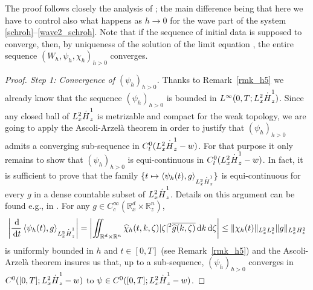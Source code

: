 \documentclass[11pt]{article}
\newcommand{\eg}{e.g.,\xspace}
\newcommand\mto{\mathchoice{\longmapsto}{\mapsto}{\mapsto}{\mapsto}}
\let\hat\oldhat
\DeclareRobustCommand{\accentset}[2]{\overset{#1}{#2}}
\theoremstyle{definition}
\newcommand*{\overbigdot}[1]{%
\accentset{\mbox{\large\bfseries .}}{#1}}
\let\hat\widehat
\newcommand{\R}{\mathbb{R}}
\newcommand{\ud}{\, {\mathrm{d}}}
\begin{document}
The proof follows closely the analysis of \cite{Lions_Paul_Wigner};
the main difference being that here we have to control also what happens as $h\to 0$ for the wave part of the system \eqref{schroh}--\eqref{wave2_schroh}.
Note that if the sequence of initial data is supposed to converge, then, by uniqueness of the solution of the limit equation \cite[Th.\,4]{dBGV}, the entire sequence
$(W_{h}, \psi_{h},\chi_{h})_{h>0}$ converges.

\begin{proof}[Proof. Step 1: Convergence of $(\psi_{h})_{h>0}$]
Thanks to Remark~\ref{rmk_h5} we already know that the sequence $(\psi_{h})_{h>0}$ is bounded in $L^{\infty}(0,T;L_{x}^{2}\overbigdot{H}_{z}^{1})$. Since any closed ball of $L_{x}^{2}\overbigdot{H}_{z}^{1}$ is metrizable and compact for the weak topology, we are going to apply the Ascoli-Arzelà theorem in order to justify that $(\psi_{h})_{h>0}$ admits a converging sub-sequence in $C_{t}^{0}(L_{x}^{2}\overbigdot{H}_{z}^{1}-w)$. For that purpose it only remains to show that $(\psi_{h})_{h>0}$ is equi-continuous in $C_{t}^{0}(L_{x}^{2}\overbigdot{H}_{z}^{1}-w)$. In fact, it is sufficient to prove that the family $\{t\mto \langle \psi_{h}(t),g\rangle_{L_{x}^{2}\overbigdot{H}_{z}^{1}}\}$ is equi-continuous for every $g$ in a dense countable subset of $L_{x}^{2}\overbigdot{H}_{z}^{1}$. Details on this argument can be found \eg in \cite[App.\,C]{PLL}.
For any $g\in C_{c}^{\infty}(\R_{x}^{d}\times\R_{z}^{n})$,
\[
\left|\frac{\ud}{\ud t}\left\langle\psi_{h}(t),g\right\rangle_{L_{x}^{2}\overbigdot{H}_{z}^{1}}\right|=\left|\iint_{\R^{d}\times\R^{n}}\hat{\chi}_{h}(t,k,\zeta)|\zeta|^{2}\overline{\hat{g}(k,\zeta)}\ud k\ud\zeta\right|\leq\|\chi_{h}(t)\|_{L_{x}^{2}L_{z}^{2}}\|g\|_{L_{x}^{2}H_{z}^{2}}
\]
is uniformly bounded in $h$ and $t\in[0,T]$ (see Remark~\ref{rmk_h5}) and the Ascoli-Arzelà theorem insures us that, up to a sub-sequence, $(\psi_{h})_{h>0}$ converges in \hbox{$C^{0}([0,T];L_{x}^{2}\overbigdot{H}_{z}^{1}-w)$} to $\psi\in C^{0}([0,T];L_{x}^{2}\overbigdot{H}_{z}^{1}-w)$.


\end{proof}
\end{document}
